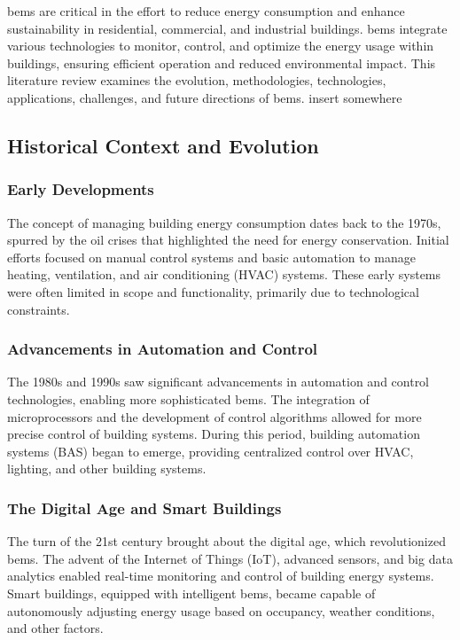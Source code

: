 \gls{bems} are critical in the effort to reduce energy consumption and enhance sustainability in residential, commercial, and industrial buildings. \gls{bems} integrate various technologies to monitor, control, and optimize the energy usage within buildings, ensuring efficient operation and reduced environmental impact. This literature review examines the evolution, methodologies, technologies, applications, challenges, and future directions of \gls{bems}.
insert somewhere \cite{manic2016building}

\subsection*{Historical Context and Evolution}

\subsubsection*{Early Developments}

The concept of managing building energy consumption dates back to the 1970s, spurred by the oil crises that highlighted the need for energy conservation. Initial efforts focused on manual control systems and basic automation to manage heating, ventilation, and air conditioning (HVAC) systems. These early systems were often limited in scope and functionality, primarily due to technological constraints.

\subsubsection*{Advancements in Automation and Control}

The 1980s and 1990s saw significant advancements in automation and control technologies, enabling more sophisticated \gls{bems}. The integration of microprocessors and the development of control algorithms allowed for more precise control of building systems. During this period, building automation systems (BAS) began to emerge, providing centralized control over HVAC, lighting, and other building systems.

\subsubsection*{The Digital Age and Smart Buildings}

The turn of the 21st century brought about the digital age, which revolutionized \gls{bems}. The advent of the Internet of Things (IoT), advanced sensors, and big data analytics enabled real-time monitoring and control of building energy systems. Smart buildings, equipped with intelligent \gls{bems}, became capable of autonomously adjusting energy usage based on occupancy, weather conditions, and other factors.

